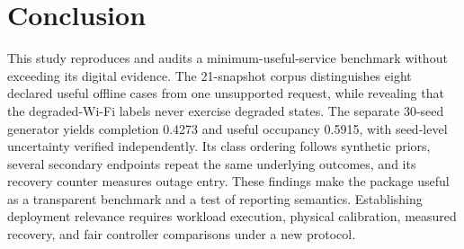 \section{Conclusion}
This study reproduces and audits a minimum-useful-service benchmark without exceeding its digital evidence. The 21-snapshot corpus distinguishes eight declared useful offline cases from one unsupported request, while revealing that the degraded-Wi-Fi labels never exercise degraded states. The separate 30-seed generator yields completion 0.4273 and useful occupancy 0.5915, with seed-level uncertainty verified independently. Its class ordering follows synthetic priors, several secondary endpoints repeat the same underlying outcomes, and its recovery counter measures outage entry. These findings make the package useful as a transparent benchmark and a test of reporting semantics. Establishing deployment relevance requires workload execution, physical calibration, measured recovery, and fair controller comparisons under a new protocol.

